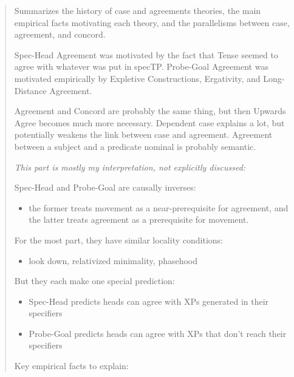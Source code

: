 
\begin{abstract}
Summarizes the history of case and agreements theories, the main empirical facts motivating each theory, and the parallelisms between case, agreement, and concord.

Spec-Head Agreement was motivated by the fact that Tense seemed to agree with whatever was put in specTP. Probe-Goal Agreement was motivated empirically by Expletive Constructions, Ergativity, and Long-Distance Agreement.

Agreement and Concord are probably the same thing, but then Upwards Agree becomes much more necessary. Dependent case explains a lot, but potentially weakens the link between case and agreement. Agreement between a subject and a predicate nominal is probably semantic.

\textit{This part is mostly my interpretation, not explicitly discussed:}

Spec-Head and Probe-Goal are causally inverses:

\begin{itemize}
  \item the former treats movement as a near-prerequisite for agreement, and the latter treats agreement as a prerequisite for movement.
\end{itemize}
For the most part, they have similar locality conditions:

\begin{itemize}
  \item look down, relativized minimality, phasehood
\end{itemize}
But they each make one special prediction:

\begin{itemize}
  \item Spec-Head predicts heads can agree with XPs generated in their specifiers
  \item Probe-Goal predicts heads can agree with XPs that don't reach their specifiers
\end{itemize}

Key empirical facts to explain:


\end{abstract}
